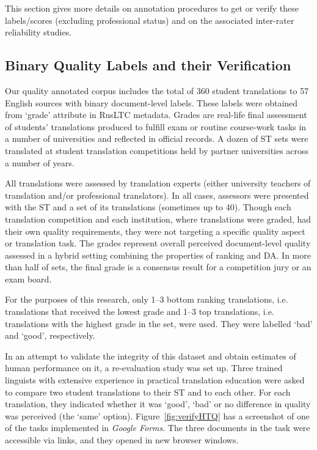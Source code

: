This section gives more details on annotation procedures to get or verify these labels/scores (excluding professional status) and on the associated inter-rater reliability studies.

\subsection{\label{ssec:binary}Binary Quality Labels and their Verification}

Our quality annotated corpus includes the total of 360 student translations to 57 English sources with binary document-level labels. These labels were obtained from `grade' attribute in \gls{RusLTC} metadata. Grades are real-life final assessment of students' translations produced to fulfill exam or routine course-work tasks in a number of universities and reflected in official records. A dozen of ST sets were translated at student translation competitions held by partner universities across a number of years. 

All translations were assessed by translation experts (either university teachers of translation and/or professional translators). In all cases, assessors were presented with the ST and a set of its translations (sometimes up to 40). Though each translation competition and each institution, where translations were graded, had their own quality requirements, they were not targeting a specific quality aspect or translation task. The grades represent overall perceived document-level quality assessed in a hybrid setting combining the properties of ranking and DA. In more than half of sets, the final grade is a consensus result for a competition jury or an exam board. 

For the purposes of this research, only 1--3 bottom ranking translations, i.e. translations that received the lowest grade and 1--3 top translations, i.e. translations with the highest grade in the set,  were used. They were labelled `bad' and `good', respectively.

In an attempt to validate the integrity of this dataset and obtain estimates of human performance on it, a re-evaluation study was set up. Three trained linguists with extensive experience in practical translation education were asked to compare two student translations to their ST and to each other.
For each translation, they indicated whether it was `good', `bad' or no difference in quality was perceived (the `same' option). Figure~\ref{fig:verifyHTQ} has a screenshot of one of the tasks implemented in \textit{Google Forms}. The three documents in the task were accessible via links, and they opened in new browser windows.

